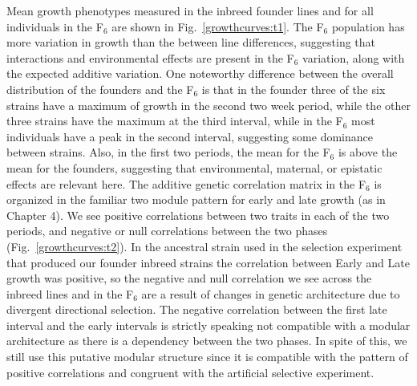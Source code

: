 \begin{refsection}
Mean growth phenotypes measured in the inbreed founder lines and for all
individuals in the F$_{\text{6}}$ are shown in Fig.~\ref{growthcurves:t1}. The
F$_{\text{6}}$ population has more variation in growth than the between line
differences, suggesting that interactions and environmental effects are
present in the F$_{\text{6}}$ variation, along with the expected additive
variation. One noteworthy difference between the overall distribution of the
founders and the F$_{\text{6}}$ is that in the founder three of the six
strains have a maximum of growth in the second two week period, while the
other three strains have the maximum at the third interval, while in the
F$_{\text{6}}$ most individuals have a peak in the second interval, suggesting
some dominance between strains. Also, in the first two periods, the mean for
the F$_{\text{6}}$ is above the mean for the founders, suggesting that
environmental, maternal, or epistatic effects are relevant here. The additive
genetic correlation matrix in the F$_{\text{6}}$ is organized in the familiar
two module pattern for early and late growth (as in Chapter 4). We see
positive correlations between two traits in each of the two periods, and
negative or null correlations between the two phases
(Fig.~\ref{growthcurves:t2}). In the ancestral strain used in the selection
experiment that produced our founder inbreed strains the correlation between
Early and Late growth was positive, so the negative and null correlation we
see across the inbreed lines and in the F$_{\text{6}}$ are a result of changes in
genetic architecture due to divergent directional
selection. The negative correlation between the
first late interval and the early intervals is strictly speaking not
compatible with a modular architecture as there is a dependency between the
two phases. In spite of this, we still use this putative modular structure
since it is compatible with the pattern of positive correlations and congruent
with the artificial selective experiment.


\end{refsection}
